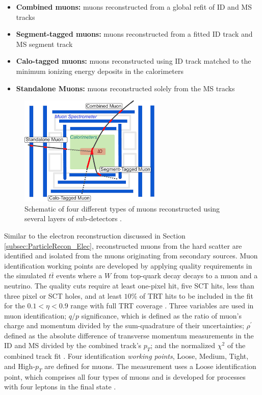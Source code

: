 \begin{itemize}
    \item{\textbf{Combined muons:} muons reconstructed from a global refit of ID and MS tracks }
    \item{\textbf{Segment-tagged muons:} muons reconstructed from a fitted ID track and MS segment track } 
    \item{\textbf{Calo-tagged muons:}  muons reconstructed using ID track matched to the minimum ionizing energy deposits in the calorimeters}
    \item{\textbf{Standalone Muons:} muons reconstructed solely from the MS tracks }
\end{itemize}

\begin{figure}
    \centering
    \includegraphics[width=.5\linewidth]{figures/LHC/MuonTypes.pdf}
    \caption{ Schematic of four different types of muons reconstructed using several layers of sub-detectors \cite{MuonReco}.\label{fig:MuonFig}}
\end{figure}

Similar to the electron reconstruction discussed in Section \ref{subsec:ParticleRecon_Elec}, reconstructed muons from the hard scatter are identified and isolated from the muons originating from secondary sources. Muon identification working points are developed by applying quality requirements in the simulated $t\bar{t}$ events where a $W$ from top-quark decay decays to a muon and a neutrino. The quality cuts require at least one-pixel hit, five SCT hits, less than three pixel or SCT holes, and at least $10\%$ of TRT hits to be included in the fit for the $0.1<\eta<0.9$ range with full TRT coverage \cite{MuonReco}. Three variables are used in muon identification; $q/p$ significance, which is defined as the ratio of muon's charge and momentum divided by the sum-quadrature of their uncertainties; $\rho^{'}$ defined as the absolute difference of transverse momentum measurements in the ID and MS divided by the combined track's $p_{T}$; and the normalized $\chi ^{2}$ of the combined track fit \cite{MuonReco}. 
Four identification \textit{working points}, Loose, Medium, Tight, and High-$p_{T}$ are defined for muons. The measurement uses a Loose identification point, which comprises all four types of muons and is developed for processes with four leptons in the final state  \cite{MuonReco}. 


